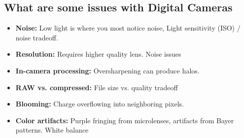 \documentclass{article}
\begin{document}
\subsection{What are some issues with Digital Cameras}
\begin{itemize}
    \item \textbf{Noise:} Low light is where you most notice noise, Light sensitivity (ISO) / noise                tradeoff.
    \item \textbf{Resolution:} Requires higher quality lens. Noise issues
    \item \textbf{In-camera processing:} Oversharpening can produce halos.
    \item \textbf{RAW vs. compressed:} File size vs. quality tradeoff
    \item \textbf{Blooming:} Charge overflowing into neighboring pixels.
    \item \textbf{Color artifacts:} Purple fringing from microlenses, artifacts from Bayer
        patterns. White balance
\end{itemize}




\end{document}
